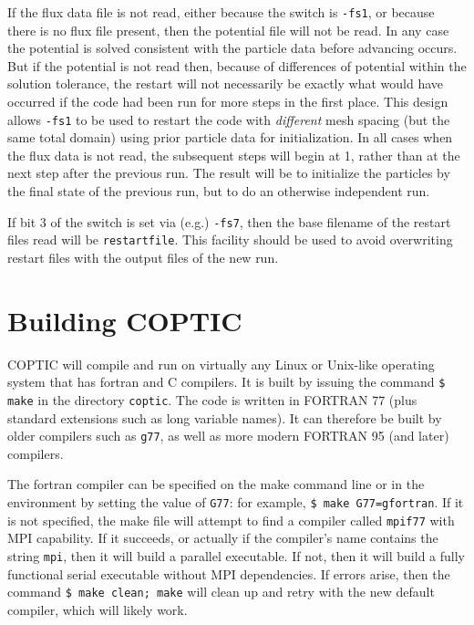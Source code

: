 \documentclass[12pt]{article}
\begin{document}
If the flux data file is not read, either because the switch is
\verb!-fs1!, or because there is no flux file present, then the
potential file will not be read. In any case the potential is solved
consistent with the particle data before advancing occurs. But if the
potential is not read then, because of differences of potential
within the solution tolerance, the restart will not necessarily be exactly
what would have occurred if the code had been run for more steps in
the first place. This design allows \verb!-fs1! to be used to
restart the code with \emph{different} mesh spacing (but the same
total domain) using prior particle data for initialization.  In all
cases when the flux data is not read, the subsequent steps will begin
at 1, rather than at the next step after the previous run. The result
will be to initialize the particles by the final state of the
previous run, but to do an otherwise independent run.

If bit 3 of the switch is set via (e.g.) \verb!-fs7!, then the base
filename of the restart files read will be \verb!restartfile!. This
facility should be used to avoid overwriting restart files with the
output files of the new run.

\section{Building COPTIC}\label{building}

COPTIC will compile and run on virtually any Linux or Unix-like
operating system that has fortran and C compilers. It is built by
issuing the command \verb!$ make! in the directory \verb!coptic!. The
code is written in FORTRAN 77 (plus standard extensions such as long
variable names). It can therefore be built by older compilers such as
\verb!g77!, as well as more modern FORTRAN 95 (and later) compilers.

The fortran compiler can be specified on the make command line or in
the environment by setting the value of \verb!G77!: for example,
\verb!$ make G77=gfortran!.  If it is not specified, the make file
will attempt to find a compiler called \verb!mpif77! with MPI
capability.  If it succeeds, or actually if the compiler's name
contains the string \verb!mpi!, then it will build a parallel
executable. If not, then it will build a fully functional serial
executable without MPI dependencies. If errors arise, then the command
\verb!$ make clean; make! will clean up and retry with the new default
compiler, which will likely work.
\end{document}
